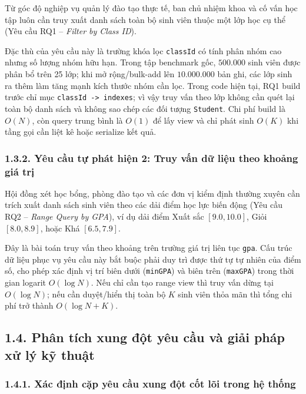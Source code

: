 \documentclass[14pt,a4paper]{extarticle}
\begin{document}
Từ góc độ nghiệp vụ quản lý đào tạo thực tế, ban chủ nhiệm khoa và cố vấn học tập luôn cần truy xuất danh sách toàn bộ sinh viên thuộc một lớp học cụ thể (Yêu cầu RQ1 -- \textit{Filter by Class ID}).

Đặc thù của yêu cầu này là trường khóa lọc \texttt{classId} có tính phân nhóm cao nhưng số lượng nhóm hữu hạn. Trong tập benchmark gốc, $500.000$ sinh viên được phân bổ trên 25 lớp; khi mở rộng/bulk-add lên $10.000.000$ bản ghi, các lớp sinh ra thêm làm tăng mạnh kích thước nhóm cần lọc. Trong code hiện tại, RQ1 build trước chỉ mục \texttt{classId -> indexes}; vì vậy truy vấn theo lớp không cần quét lại toàn bộ danh sách và không sao chép các đối tượng \texttt{Student}. Chi phí build là $O(N)$, còn query trung bình là $O(1)$ để lấy view và chỉ phát sinh $O(K)$ khi tầng gọi cần liệt kê hoặc serialize kết quả.

\subsubsection*{1.3.2. Yêu cầu tự phát hiện 2: Truy vấn dữ liệu theo khoảng giá trị}
{}

Hội đồng xét học bổng, phòng đào tạo và các đơn vị kiểm định thường xuyên cần trích xuất danh sách sinh viên theo các dải điểm học lực biến động (Yêu cầu RQ2 -- \textit{Range Query by GPA}), ví dụ dải điểm Xuất sắc $[9.0, 10.0]$, Giỏi $[8.0, 8.9]$, hoặc Khá $[6.5, 7.9]$.

Đây là bài toán truy vấn theo khoảng trên trường giá trị liên tục \texttt{gpa}. Cấu trúc dữ liệu phục vụ yêu cầu này bắt buộc phải duy trì được thứ tự tự nhiên của điểm số, cho phép xác định vị trí biên dưới (\texttt{minGPA}) và biên trên (\texttt{maxGPA}) trong thời gian logarit $O(\log N)$. Nếu chỉ cần tạo range view thì truy vấn dừng tại $O(\log N)$; nếu cần duyệt/hiển thị toàn bộ $K$ sinh viên thỏa mãn thì tổng chi phí trở thành $O(\log N + K)$.

\subsection*{1.4. Phân tích xung đột yêu cầu và giải pháp xử lý kỹ thuật}
{}

\subsubsection*{1.4.1. Xác định cặp yêu cầu xung đột cốt lõi trong hệ thống}
{}
\end{document}
